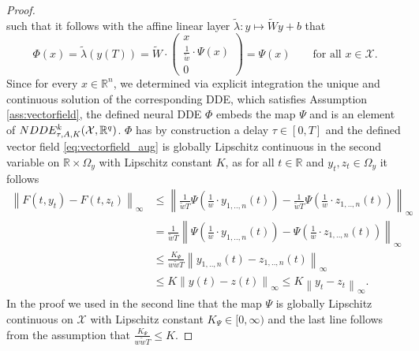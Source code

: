 \documentclass[10pt,a4paper]{amsart}
\newcommand\norm[1]{\left\lVert#1\right\rVert}
\begin{document}
\begin{proof}
\begin{equation*}
		\end{equation*} 
		such that it follows with the affine linear layer $\tilde \lambda: y \mapsto \widetilde{W}y+b$ that
		\begin{equation*}
			\Phi(x) = \tilde{\lambda}(y(T))  = \widetilde{W}\cdot \begin{pmatrix}
				x \\ \frac{1}{\tilde w}\cdot \Psi(x) \\ 0
			\end{pmatrix} = \Psi(x) \qquad \text{for all } x \in \mathcal{X}.
		\end{equation*}
		Since for every $x \in \mathbb{R}^n$, we determined via explicit integration the unique and continuous solution of the corresponding DDE, which satisfies Assumption \ref{ass:vectorfield}, the defined neural DDE $\Phi$ embeds the map $\Psi$ and is an element of $\textup{NDDE}^k_{\tau,\textup{A},K}(\mathcal{X},\mathbb{R}^q)$. $\Phi$ has by construction a delay $\tau\in[0,T]$ and the defined vector field \eqref{eq:vectorfield_aug} is globally Lipschitz continuous in the second variable on $\mathbb{R}\times \Omega_y$ with Lipschitz constant $K$, as for all $t \in \mathbb{R}$ and $y_t,z_t \in \Omega_y$ it follows
		\begin{align*}
			\norm{F(t,y_t)-F(t,z_t)}_\infty  & \leq \norm{\frac{1}{\tilde w T}\Psi\left(\frac{1}{w}\cdot y_{1,..,n}(t)\right)- \frac{1}{\tilde w T}\Psi\left(\frac{1}{w}\cdot z_{1,..,n}(t)\right)}_\infty \\
			& = \frac{1}{\tilde wT}\norm{\Psi\left(\frac{1}{w}\cdot y_{1,..,n}(t)\right)- \Psi\left(\frac{1}{w}\cdot z_{1,..,n}(t)\right)}_\infty \\
			& \leq \frac{K_\Psi}{w \tilde w T} \norm{y_{1,..,n}(t)-z_{1,..,n}(t)}_\infty  \\
			& \leq K \norm{y(t)-z(t)}_\infty \leq K\norm{y_t-z_t}_\infty.
		\end{align*}
		In the proof we used in the second line that the map $\Psi$ is globally Lipschitz continuous on $\mathcal{X}$ with Lipschitz constant $K_\Psi\in[0,\infty)$ and the last line follows from the assumption that $\frac{K_\Psi}{w \tilde w T} \leq K$. 
	\end{proof}
\end{document}
